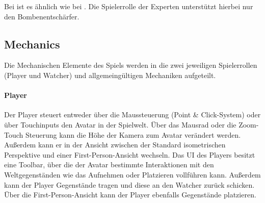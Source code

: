 Bei  ist es ähnlich wie bei . Die Spielerrolle der Experten unterstützt hierbei nur den Bombenentschärfer.




\subsection{Mechanics}
Die Mechanischen Elemente des Spiels werden in die zwei jeweiligen Spielerrollen (Player und Watcher) und allgemeingültigen Mechaniken aufgeteilt.

\paragraph{Player}
Der Player steuert entweder über die Maussteuerung (Point \& Click-System) oder über Touchinputs den Avatar in der Spielwelt. Über das Mausrad oder die Zoom-Touch Steuerung kann die Höhe der Kamera zum Avatar verändert werden. Außerdem kann er in der Ansicht zwischen der Standard isometrischen Perspektive und einer First-Person-Ansicht wechseln. Das \ac{UI} des Players besitzt eine Toolbar, über die der Avatar bestimmte Interaktionen mit den Weltgegenständen wie das Aufnehmen oder Platzieren vollführen kann. Außerdem kann der Player Gegenstände tragen und diese an den Watcher zurück schicken. Über die First-Person-Ansicht kann der Player ebenfalls Gegenstände platzieren.

